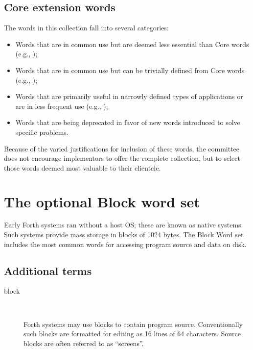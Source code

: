 
\setcounter{subsection}{1}
\subsection{Core extension words} %
\label{rat:core-ext}

The words in this collection fall into several categories:

\begin{itemize}
\item Words that are in common use but are deemed less essential than
	Core words (e.g., );

\item Words that are in common use but can be trivially defined from
	Core words (e.g., );

\item Words that are primarily useful in narrowly defined types of
	applications or are in less frequent use (e.g., );

\item Words that are being deprecated in favor of new words introduced
	to solve specific problems.
\end{itemize}

Because of the varied justifications for inclusion of these words,
the committee does not encourage implementors to offer the complete
collection, but to select those words deemed most valuable to their
clientele.



\section{The optional Block word set} %
\label{rat:block}

Early Forth systems ran without a host OS; these are known as native
systems.  Such systems provide mass storage in blocks of 1024 bytes.
The Block Word set includes the most common words for accessing
program source and data on disk.

\setcounter{subsection}{1}
\subsection{Additional terms} %
\label{rat:block:terms}

\begin{description}
\item[block] ~

	Forth systems may use blocks to contain program source.
	Conventionally such blocks are formatted for editing as
	16 lines of 64 characters. Source blocks are often referred
	to as ``screens''.
\end{description}

